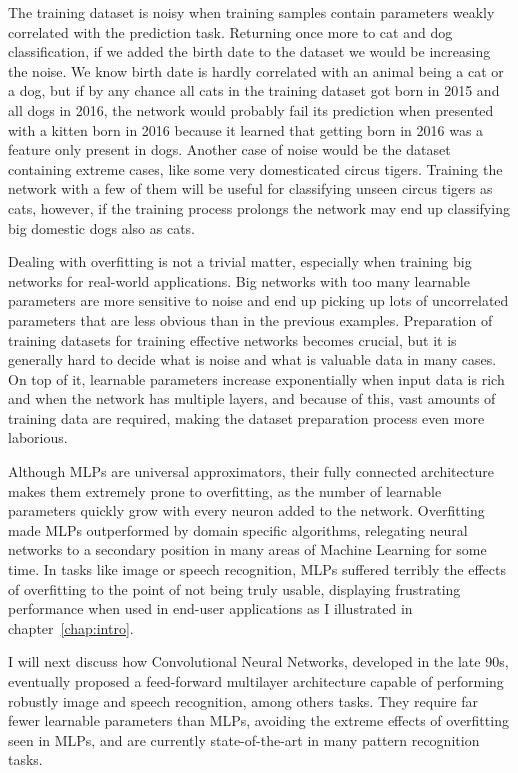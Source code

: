The training dataset is noisy when training samples contain parameters weakly correlated with the prediction task.
Returning once more to cat and dog classification, if we added the birth date to the dataset we would be increasing the noise.
We know birth date is hardly correlated with an animal being a cat or a dog, but if by any chance all cats in the training dataset got born in 2015 and all dogs in 2016, the network would probably fail its prediction when presented with a kitten born in 2016 because it learned that getting born in 2016 was a feature only present in dogs.
Another case of noise would be the dataset containing extreme cases, like some very domesticated circus tigers.
Training the network with a few of them will be useful for classifying unseen circus tigers as cats, however, if the training process prolongs the network may end up classifying big domestic dogs also as cats.

Dealing with overfitting is not a trivial matter, especially when training big networks for real-world applications.
Big networks with too many learnable parameters are more sensitive to noise and end up picking up lots of uncorrelated parameters that are less obvious than in the previous examples.
Preparation of training datasets for training effective networks becomes crucial, but it is generally hard to decide what is noise and what is valuable data in many cases.
On top of it, learnable parameters increase exponentially when input data is rich and when the network has multiple layers, and because of this, vast amounts of training data are required, making the dataset preparation process even more laborious.

Although MLPs are universal approximators, their fully connected architecture makes them extremely prone to overfitting, as the number of learnable parameters quickly grow with every neuron added to the network.
Overfitting made MLPs outperformed by domain specific algorithms, relegating neural networks to a secondary position in many areas of Machine Learning for some time.
In tasks like image or speech recognition, MLPs suffered terribly the effects of overfitting to the point of not being truly usable, displaying frustrating performance when used in end-user applications as I illustrated in chapter~\ref{chap:intro}.

I will next discuss how Convolutional Neural Networks, developed in the late 90s, eventually proposed a feed-forward multilayer architecture capable of performing robustly image and speech recognition, among others tasks.
They require far fewer learnable parameters than MLPs, avoiding the extreme effects of overfitting seen in MLPs, and are currently state-of-the-art in many pattern recognition tasks.


